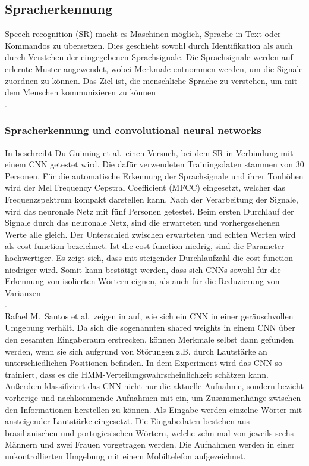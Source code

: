 \subsection{Spracherkennung}
Speech recognition (SR) macht es Maschinen möglich, Sprache in Text oder Kommandos zu übersetzen. Dies geschieht sowohl durch Identifikation als auch durch Verstehen der eingegebenen Sprachsignale. Die Sprachsignale werden auf erlernte Muster angewendet, wobei Merkmale entnommen werden, um die Signale zuordnen zu können. Das Ziel ist, die menschliche Sprache zu verstehen, um mit dem Menschen kommunizieren zu können \cite{technology}\\.

\subsubsection{Spracherkennung und convolutional neural networks}
In \cite{usingcnn} beschreibt Du Guiming et al.~einen Versuch, bei dem SR in Verbindung mit einem CNN getestet wird. Die dafür verwendeten Trainingsdaten stammen von 30 Personen. Für die automatische Erkennung der Sprachsignale und ihrer Tonhöhen wird der Mel Frequency Cepstral Coefficient (MFCC) \cite{MFCC} eingesetzt, welcher das Frequenzspektrum kompakt darstellen kann. Nach der Verarbeitung der Signale, wird das neuronale Netz mit fünf Personen getestet. Beim ersten Durchlauf der Signale durch das neuronale Netz, sind die erwarteten und vorhergesehenen Werte alle gleich. Der Unterschied zwischen erwarteten und echten Werten wird als cost function bezeichnet. Ist die cost function niedrig, sind die Parameter hochwertiger. Es zeigt sich, dass mit steigender Durchlaufzahl die cost function niedriger wird. Somit kann bestätigt werden, dass sich CNNs sowohl für die Erkennung von isolierten Wörtern eignen, als auch für die Reduzierung von Varianzen \cite{usingcnn}\\.
\\
Rafael M.~Santos et al.~zeigen in \cite{noisycnn} auf, wie sich ein CNN in einer geräuschvol\-len Umgebung verhält. Da sich die sogenannten shared weights in einem CNN über den gesamten Eingaberaum erstrecken, können Merkmale selbst dann gefunden werden, wenn sie sich aufgrund von Störungen z.B. durch Lautstärke an unterschiedlichen Positionen befinden. In dem Experiment wird das CNN so trainiert, dass es die HMM-Verteilungswahrscheinlich\-keit schätzen kann. Außerdem klassifiziert das CNN nicht nur die aktuelle Aufnahme, sondern bezieht vorherige und nachkommende Aufnahmen mit ein, um Zusammenhän\-ge zwischen den Informationen herstellen zu können. Als Eingabe werden einzel\-ne Wörter mit ansteigender Lautstärke eingesetzt. Die Eingabedaten bestehen aus brasilianischen und portugiesischen Wörtern, welche zehn mal von jeweils sechs Männern und zwei Frauen vorgetragen werden. Die Aufnahmen werden in einer unkontrollierten Umgebung mit einem Mobiltelefon aufgezeichnet.\\
